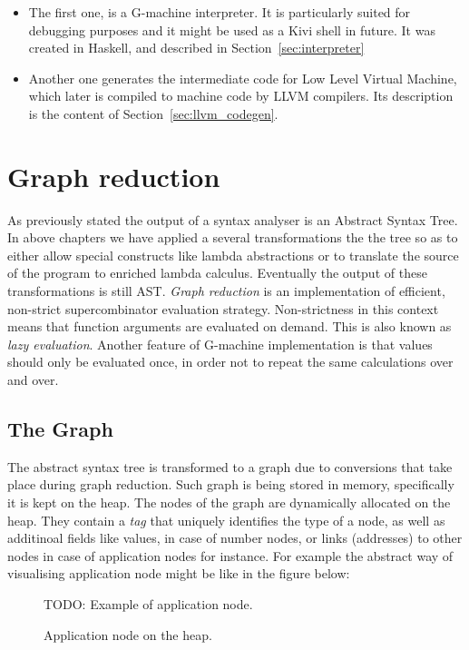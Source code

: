 \documentclass[12pt,a4paper]{report}
\begin{document}
\begin{itemize}
  \item The first one, is a G-machine interpreter. It is particularly suited
    for debugging purposes and it might be used as a Kivi shell in future. It
    was created in Haskell, and described in Section~\ref{sec:interpreter}
  \item Another one generates the intermediate code for Low Level Virtual
    Machine, which later is compiled to machine code by LLVM compilers. Its
    description is the content of Section~\ref{sec:llvm_codegen}.
\end{itemize}

\section{Graph reduction}
\label{sec:graph_reduction}
As previously stated the output of a syntax analyser is an Abstract Syntax
Tree. In above chapters we have applied a several transformations the the tree
so as to either allow special constructs like lambda abstractions or to
translate the source of the program to enriched lambda calculus. Eventually the
output of these transformations is still AST. \textit{Graph reduction} is an
implementation of efficient, non-strict supercombinator evaluation strategy.
Non-strictness in this context means that function arguments are evaluated on
demand. This is also known as \textit{lazy evaluation}. Another feature of
G-machine implementation is that values should only be evaluated once, in order
not to repeat the same calculations over and over.

\subsection{The Graph}
The abstract syntax tree is transformed to a graph due to conversions that take
place during graph reduction. Such graph is being stored in memory,
specifically it is kept on the heap. The nodes of the graph are dynamically
allocated on the heap. They contain a \textit{tag} that uniquely identifies the
type of a node, as well as additinoal fields like values, in case of number
nodes, or links (addresses) to other nodes in case of application nodes for
instance. For example the abstract way of visualising application node might be
like in the figure below:

\begin{figure}[h!]
  \centering

  TODO: Example of application node.

  \caption{Application node on the heap.}
  \label{fig:application_node}
\end{figure}
\end{document}
